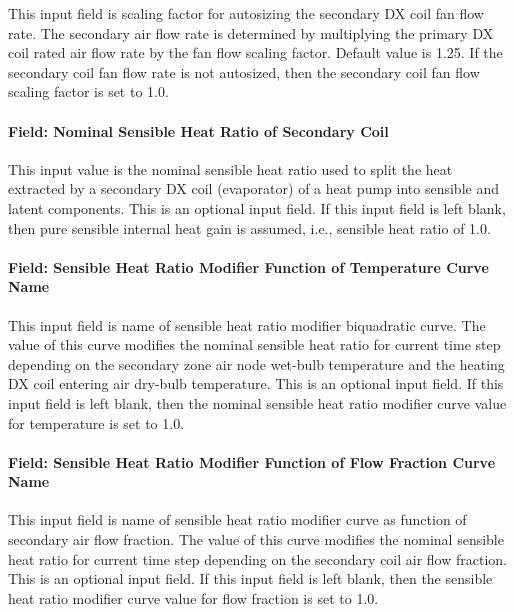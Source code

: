 This input field is scaling factor for autosizing the secondary DX coil fan flow rate. The secondary air flow rate is determined by multiplying the primary DX coil rated air flow rate by the fan flow scaling factor. Default value is 1.25. If the secondary coil fan flow rate is not autosized, then the secondary coil fan flow scaling factor is set to 1.0.

\paragraph{Field: Nominal Sensible Heat Ratio of Secondary Coil}\label{field-nominal-sensible-heat-ratio-of-secondary-coil}

This input value is the nominal sensible heat ratio used to split the heat extracted by a secondary DX coil (evaporator) of a heat pump into sensible and latent components. This is an optional input field. If this input field is left blank, then pure sensible internal heat gain is assumed, i.e., sensible heat ratio of 1.0.

\paragraph{Field: Sensible Heat Ratio Modifier Function of Temperature Curve Name}\label{field-sensible-heat-ratio-modifier-function-of-temperature-curve-name}

This input field is name of sensible heat ratio modifier biquadratic curve. The value of this curve modifies the nominal sensible heat ratio for current time step depending on the secondary zone air node wet-bulb temperature and the heating DX coil entering air dry-bulb temperature. This is an optional input field. If this input field is left blank, then the nominal sensible heat ratio modifier curve value for temperature is set to 1.0.

\paragraph{Field: Sensible Heat Ratio Modifier Function of Flow Fraction Curve Name}\label{field-sensible-heat-ratio-modifier-function-of-flow-fraction-curve-name}

This input field is name of sensible heat ratio modifier curve as function of secondary air flow fraction. The value of this curve modifies the nominal sensible heat ratio for current time step depending on the secondary coil air flow fraction. This is an optional input field. If this input field is left blank, then the sensible heat ratio modifier curve value for flow fraction is set to 1.0.

